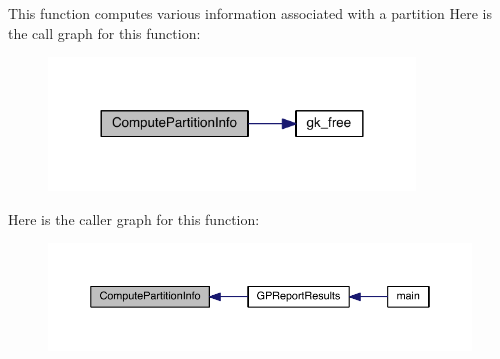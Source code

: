 This function computes various information associated with a partition Here is the call graph for this function\+:\nopagebreak
\begin{figure}[H]
\begin{center}
\leavevmode
\includegraphics[width=276pt]{a00966_a16087d53e4f04771ed2ffbd810711cba_cgraph}
\end{center}
\end{figure}
Here is the caller graph for this function\+:\nopagebreak
\begin{figure}[H]
\begin{center}
\leavevmode
\includegraphics[width=350pt]{a00966_a16087d53e4f04771ed2ffbd810711cba_icgraph}
\end{center}
\end{figure}
